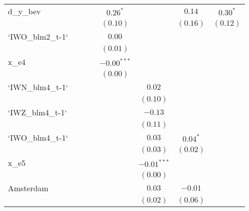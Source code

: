 \begin{center}
\begin{longtable}{l c c c c c c c }
d\_y\_bev        &               &             &              & $0.26^{*}$    &               & $0.14$        & $0.30^{*}$    \\
                 &               &             &              & $(0.10)$      &               & $(0.16)$      & $(0.12)$      \\
`IWO\_blm2\_t-1` &               &             &              & $0.00$        &               &               &               \\
                 &               &             &              & $(0.01)$      &               &               &               \\
x\_e4            &               &             &              & $-0.00^{***}$ &               &               &               \\
                 &               &             &              & $(0.00)$      &               &               &               \\
`IWN\_blm4\_t-1` &               &             &              &               & $0.02$        &               &               \\
                 &               &             &              &               & $(0.10)$      &               &               \\
`IWZ\_blm4\_t-1` &               &             &              &               & $-0.13$       &               &               \\
                 &               &             &              &               & $(0.11)$      &               &               \\
`IWO\_blm4\_t-1` &               &             &              &               & $0.03$        & $0.04^{*}$    &               \\
                 &               &             &              &               & $(0.03)$      & $(0.02)$      &               \\
x\_e5            &               &             &              &               & $-0.01^{***}$ &               &               \\
                 &               &             &              &               & $(0.00)$      &               &               \\
Amsterdam        &               &             &              &               & $0.03$        & $-0.01$       &               \\
                 &               &             &              &               & $(0.02)$      & $(0.06)$      &               \\

\end{longtable}
\end{center}
